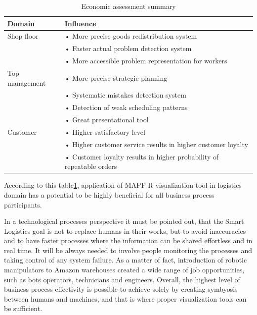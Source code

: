 \documentclass[thesis=B,english]{FITthesis}[2019/12/23]
\begin{document}
\begin{table}[h]\label{fig:float28}
\centering
\caption[Economic assessment summary]{Economic assessment summary}
\begin{tabular}{|l|l|}\hline
Domain		& Influence		
\tabularnewline \hline \hline
Shop floor		&• More	precise goods redistribution system
\tabularnewline 
\newline 	&• Faster actual problem detection system
\tabularnewline 
\newline 	&• More accessible problem representation for workers
\tabularnewline \hline
Top management	&•	More precise strategic planning \tabularnewline 
\newline	&• Systematic mistakes detection system	   
\tabularnewline 
\newline 	&•	Detection of weak scheduling patterns
\tabularnewline 
\newline 	&•	Great presentational tool
\tabularnewline \hline
Customer		&•	Higher satisfactory level	
\tabularnewline 
\newline 	&•	Higher customer service results in higher customer loyalty
\tabularnewline 
\newline 	&•	Customer loyalty results in higher probability of repeatable orders
\tabularnewline\hline 
\end{tabular}
\end{table}

According to this table\ref{fig:float28}, application of MAPF-R visualization tool in logistics domain
has a potential to be highly beneficial for all business process participants.

In a technological processes perspective it must be pointed out, that the Smart Logistics goal is not to replace humans in their works, but to avoid inaccuracies and to have faster processes where the information can be shared effortless and in real time. It will be always needed to involve people monitoring the processes and taking control of any system failure.  As a matter of fact, introduction of robotic manipulators to Amazon warehouses created a wide range of job opportunities, such as bots operators, technicians and engineers. Overall, the highest level of business process effectivity is possible to achieve solely by creating symbyosis between humans and machines, and that is where proper visualization tools can be sufficient.
\end{document}
